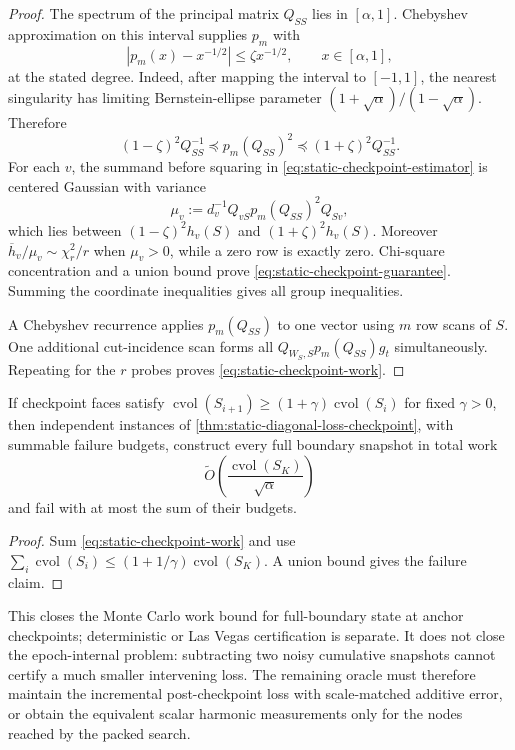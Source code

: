 \begin{proof}
The spectrum of the principal matrix $Q_{SS}$ lies in $[\alpha,1]$.
Chebyshev approximation on this interval supplies $p_m$ with
\begin{equation*}
 |p_m(x)-x^{-1/2}|\leq\zeta x^{-1/2},
 \qquad x\in[\alpha,1],
\end{equation*}
at the stated degree.  Indeed, after mapping the interval to $[-1,1]$, the
nearest singularity has limiting Bernstein-ellipse parameter
$(1+\sqrt\alpha)/(1-\sqrt\alpha)$.  Therefore
\begin{equation*}
 (1-\zeta)^2Q_{SS}^{-1}
 \preceq p_m(Q_{SS})^2
 \preceq(1+\zeta)^2Q_{SS}^{-1}.
\end{equation*}
For each $v$, the summand before squaring in
\cref{eq:static-checkpoint-estimator} is centered Gaussian with variance
\begin{equation*}
 \mu_v:=d_v^{-1}Q_{vS}p_m(Q_{SS})^2Q_{Sv},
\end{equation*}
which lies between $(1-\zeta)^2h_v(S)$ and
$(1+\zeta)^2h_v(S)$.  Moreover
$\overline h_v/\mu_v\sim\chi_r^2/r$ when $\mu_v>0$, while a zero row is
exactly zero.  Chi-square concentration and a union bound prove
\cref{eq:static-checkpoint-guarantee}.  Summing the coordinate inequalities
gives all group inequalities.

A Chebyshev recurrence applies $p_m(Q_{SS})$ to one vector using $m$ row
scans of $S$.  One additional cut-incidence scan forms all
$Q_{W_S,S}p_m(Q_{SS})g_t$ simultaneously.  Repeating for the $r$ probes proves
\cref{eq:static-checkpoint-work}.
\end{proof}

\begin{corollary}
\label{cor:static-diagonal-geometric-amortization}
If checkpoint faces satisfy
$\operatorname{cvol}(S_{i+1})\geq
(1+\gamma)\operatorname{cvol}(S_i)$ for fixed $\gamma>0$, then independent
instances of \cref{thm:static-diagonal-loss-checkpoint}, with summable failure
budgets, construct every full boundary snapshot in total work
\begin{equation}
 \widetilde O\!\left(
  \frac{\operatorname{cvol}(S_K)}{\sqrt\alpha}
 \right)
 \label{eq:static-diagonal-geometric-work}
\end{equation}
and fail with at most the sum of their budgets.
\end{corollary}

\begin{proof}
Sum \cref{eq:static-checkpoint-work} and use
$\sum_i\operatorname{cvol}(S_i)\leq
(1+1/\gamma)\operatorname{cvol}(S_K)$.  A union bound gives the failure
claim.
\end{proof}

This closes the Monte Carlo work bound for full-boundary state at anchor
checkpoints; deterministic or Las Vegas certification is separate.  It does
not close the epoch-internal problem: subtracting two noisy cumulative
snapshots cannot certify a much smaller intervening loss.  The remaining
oracle must therefore maintain the incremental post-checkpoint loss with
scale-matched additive error, or obtain the equivalent scalar harmonic
measurements only for the nodes reached by the packed search.
